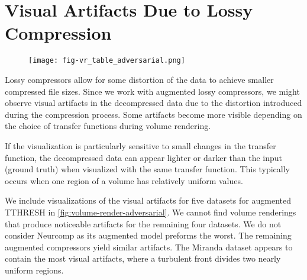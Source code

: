 \section{Visual Artifacts Due to Lossy Compression}
\label{sec:visual-artifacts}

\begin{figure*}[]
\centering
  \begin{subfigure}[b]{0.02\textwidth}
  \end{subfigure}
  \begin{subfigure}[b]{0.97\textwidth}
    \texttt{[image: fig-vr\_table\_adversarial.png]}
  \end{subfigure}
\label{fig:volume-render-adversarial}
\end{figure*}

Lossy compressors allow for some distortion of the data to achieve smaller compressed file sizes. Since we work with augmented lossy compressors, we might observe visual artifacts in the decompressed data due to the distortion introduced during the compression process. Some artifacts become  more visible depending on the choice of transfer functions during volume rendering. 


If the visualization is particularly sensitive to small changes in the transfer function, the decompressed data can appear lighter or darker than the input (ground truth) when visualized with the same transfer function. This typically occurs when one region of a volume has relatively uniform values. 

We include visualizations of the visual artifacts for five datasets for augmented TTHRESH in \cref{fig:volume-render-adversarial}. 
We cannot find volume renderings that produce noticeable artifacts for the remaining four datasets. 
We do not consider Neurcomp as its augmented model preforms the worst. The remaining augmented compressors yield similar artifacts. The Miranda dataset appears to contain the most visual artifacts, where a turbulent front divides two nearly uniform regions.